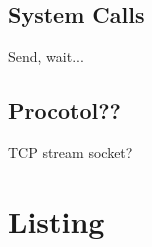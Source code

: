 \documentclass[11pt,a4paper]{article}
\begin{document}
\subsection{System Calls}
\label{sec:syscall}

Send, wait...

\subsection{Procotol??}
\label{sec:prot}

TCP stream socket?



\newpage

\section{Listing}






\end{document}
